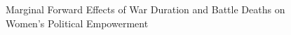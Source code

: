 \documentclass [12pt] {article}
\begin{document}
\begin{figure}[h]
   \centering
    \caption{Marginal Forward Effects of War Duration and Battle Deaths on Women's Political Empowerment}
    \label{durbd}

\end{figure}
\end{document}
